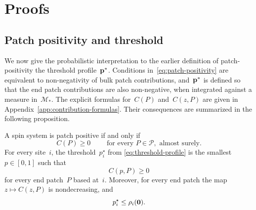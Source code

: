 \documentclass[EJP,preprint,NODS,nobera]{ejpecp}
\begin{document}
\FloatBarrier

\section{Proofs}
\label{sec:proofs}

\subsection{Patch positivity and threshold}
\label{subsec:proof-patch-positivity-threshold}

We now give the probabilistic interpretation to the earlier definition of patch-positivity the threshold profile~$\mathbf{p}^*$. Conditions in~\eqref{eq:patch-positivity} are equivalent to non-negativity of bulk patch contributions, and~$\mathbf{p}^*$ is defined so that the end patch contributions are also non-negative, when integrated against a measure in~$\mathcal{M}_*$. The
explicit formulas for~$C(P)$ and~$C(z,P)$ are given in
Appendix~\ref{app:contribution-formulas}. Their consequences are
summarized in the following proposition.

\begin{proposition}
\label{prop:patch-contribution-positivity}
A spin system is patch positive if and only if
\begin{equation*}
C(P)\geq0 \qquad \text{ for every }P\in\mathcal{P}, \text{ almost surely.}
\end{equation*}
For every site~$i$, the threshold~$p_i^\star$ from
\eqref{eq:threshold-profile} is the smallest~$p\in[0,1]$ such that
\begin{equation*}
C(p,P)\geq0
\end{equation*}
for every end patch~$P$ based at~$i$. Moreover, for every end patch the map~$z\mapsto C(z,P)$ is nondecreasing, and
\begin{equation}
\label{eq:threshold-below-zero-neighbour-refresh}
p_i^\star\leq\rho_i(\mathbf{0}).
\end{equation}
\end{proposition}
\end{document}
